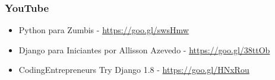 \documentclass[aspectratio=169]{beamer}
\begin{document}
\begin{frame}[fragile]\frametitle{YouTube}

\begin{itemize}
	\item Python para Zumbis - \url{https://goo.gl/swsHmw}
	\item Django para Iniciantes por Allisson Azevedo - \url{https://goo.gl/38ttOb}
	\item CodingEntrepreneurs Try Django 1.8 - \url{https://goo.gl/HNxRou}
\end{itemize}

\end{frame}

\begin{frame}
	\titlepage
\end{frame}
\end{document}
